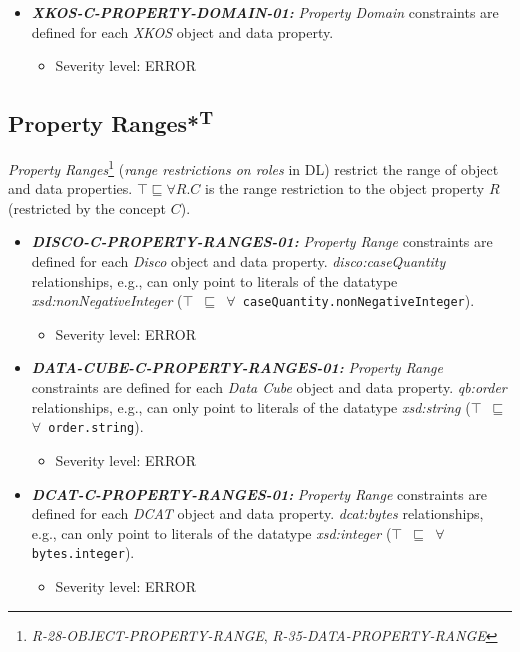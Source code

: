 \documentclass{llncs}
\newcommand{\ms}[1]{\texttt{#1}}
\begin{document}
\begin{itemize}
	\item \textbf{{\em XKOS-C-PROPERTY-DOMAIN-01:}} 
	{\em Property Domain} constraints are defined for each \emph{XKOS} object and data property.
	\begin{itemize}
		\item Severity level: ERROR
	\end{itemize}
\end{itemize}

\subsection{Property Ranges*\textsuperscript{T}}

{\em Property Ranges}\footnote{{\em R-28-OBJECT-PROPERTY-RANGE}, {\em R-35-DATA-PROPERTY-RANGE}} ({\em range restrictions on roles} in DL) restrict the range of object and data properties.
$\top \sqsubseteq \forall R . C$ is the range restriction to the object property $R$ (restricted by the concept $C$). 

\begin{itemize}
	\item \textbf{{\em DISCO-C-PROPERTY-RANGES-01:}} 
	{\em Property Range} constraints are defined for each \emph{Disco} object and data property.
  {\em disco:caseQuantity} relationships, e.g., can only point to literals of the datatype {\em xsd:nonNegativeInteger} (\ms{$\top$ $\sqsubseteq$ $\forall$ caseQuantity.nonNegativeInteger}).
	\begin{itemize}
		\item Severity level: ERROR
	\end{itemize}
\end{itemize}

\begin{itemize}
	\item \textbf{{\em DATA-CUBE-C-PROPERTY-RANGES-01:}} 
	{\em Property Range} constraints are defined for each \emph{Data Cube} object and data property.
  {\em qb:order} relationships, e.g., can only point to literals of the datatype {\em xsd:string} (\ms{$\top$ $\sqsubseteq$ $\forall$ order.string}).
	\begin{itemize}
		\item Severity level: ERROR
	\end{itemize}
\end{itemize}

\begin{itemize}
	\item \textbf{{\em DCAT-C-PROPERTY-RANGES-01:}} 
	{\em Property Range} constraints are defined for each \emph{DCAT} object and data property.
  {\em dcat:bytes} relationships, e.g., can only point to literals of the datatype {\em xsd:integer} (\ms{$\top$ $\sqsubseteq$ $\forall$ bytes.integer}).
	\begin{itemize}
		\item Severity level: ERROR
	\end{itemize}
\end{itemize}
\end{document}
